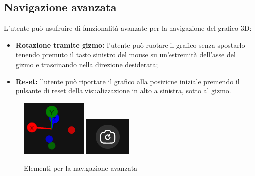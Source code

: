 \subsection{Navigazione avanzata}
L'utente può usufruire di funzionalità avanzate per la navigazione del grafico
3D:
\begin{itemize}
    \item \textbf{Rotazione tramite gizmo:} l'utente può ruotare il grafico
          senza spostarlo tenendo premuto il tasto sinistro del mouse su un'estremità
          dell'asse del gizmo e trascinando nella direzione desiderata;
    \item \textbf{Reset:} l'utente può riportare il grafico alla posizione
          iniziale premendo il pulsante di reset della
          visualizzazione in alto a sinistra, sotto al gizmo.
\end{itemize}
\begin{figure}[ht!]
    \centering
    \includegraphics[scale=0.6]{template/images/gizmo.png}
    \hspace{1cm}
    \includegraphics[scale=0.6]{template/images/resetcam.png}
    \caption{Elementi per la navigazione avanzata}
\end{figure}

